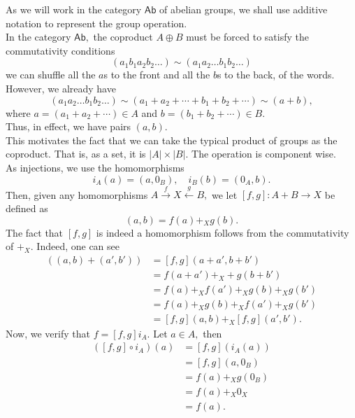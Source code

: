 \documentclass[11pt,leqno,landscape,semhelv]{seminar}
\theoremstyle{definition}
\numberwithin{joke}{section}
\numberwithin{thm}{section}
\numberwithin{equation}{section}
\begin{document}
As we will work in the category $\mathsf{Ab}$ of abelian groups, we shall use additive notation to represent the group operation.\\
In the category $\mathsf{Ab},$ the coproduct $A \oplus B$ must be forced to satisfy the commutativity conditions
\begin{equation*} 
  (a_1b_1a_2b_2\ldots) \sim (a_1a_2\ldots b_1b_2\ldots)
\end{equation*}
we can shuffle all the $a$s to the front and all the $b$s to the back, of the words. However, we already have
\begin{equation*} 
  (a_1a_2\ldots b_1b_2\ldots) \sim (a_1 + a_2 + \cdots + b_1 + b_2 + \cdots) \sim (a + b),
\end{equation*}
where $a = (a_1 + a_2 + \cdots) \in A$ and $b = (b_1 + b_2 + \cdots) \in B.$\\
Thus, in effect, we have pairs $(a, b).$ \\
This motivates the fact that we can take the typical product of groups as the coproduct. That is, as a set, it is $|A| \times |B|.$ The operation is component wise.\\
As injections, we use the homomorphisms
\begin{equation*} 
  i_A(a) = (a, 0_B), \quad i_B(b) = (0_A, b).
\end{equation*}
Then, given any homomorphisms $A \overset{f}{\longrightarrow}X \overset{g}{\longleftarrow} B,$ we let $[f, g]:A + B \to X$ be defined as
\begin{equation*} 
  [f, g](a, b) = f(a) +_X g(b).
\end{equation*}
The fact that $[f, g]$ is indeed a homomorphism follows from the commutativity of $+_X.$ Indeed, one can see
\begin{align*} 
  [f, g]((a, b) + (a', b')) &= [f, g](a + a', b + b')\\
  &= f(a + a') +_X + g(b + b')\\
  &= f(a) +_X f(a') +_X g(b) +_X g(b')\\
  &= f(a) +_X g(b) +_X f(a') +_X g(b')\\
  &= [f, g](a, b) +_X [f, g](a', b').
\end{align*}
Now, we verify that $f = [f, g]i_A.$ Let $a \in A,$ then
\begin{align*} 
  ([f, g]\circ i_A)(a) &= [f, g](i_A(a))\\
  &= [f, g](a, 0_B)\\
  &= f(a) +_X g(0_B)\\
  &= f(a) +_X 0_X\\
  &= f(a).
\end{align*}
\end{document}
